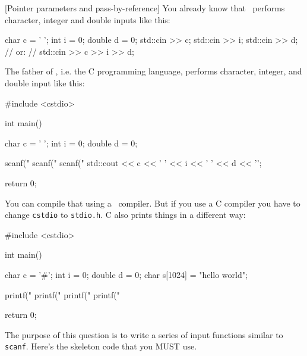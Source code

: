  [Pointer parameters and pass-by-reference]
You already know that \cpp\ performs character,
integer and double inputs like this:
\begin{console}
char c = ' ';
int i = 0;
double d = 0;
std::cin >> c;
std::cin >> i;
std::cin >> d;
// or:
// std::cin >> c >> i >> d;
\end{console}

The father of \cpp, i.e. the C programming language,
performs character, integer, and double input like this:
\begin{console}
#include <cstdio>

int main()
{
    char c = ' ';
    int i = 0;
    double d = 0;
    
    scanf("%
    scanf("%
    scanf("%
    std::cout << c << ' ' << i << ' ' << d << '\n';
    
    return 0;
}
\end{console}
You can compile that using a \cpp\ compiler.
But if you use a C compiler you have to change \verb!cstdio! to
\verb!stdio.h!.
C also prints things in a different way:
\begin{console}
#include <cstdio>

int main()
{
    char c = '#';
    int i = 0;
    double d = 0;
    char s[1024] = "hello world";
    
    printf("%
    printf("%
    printf("%
    printf("%
    
    return 0;
}
\end{console}
The purpose of this question is to write a series of input
functions similar to 
\verb!scanf!.
Here's the skeleton code that you MUST use.

